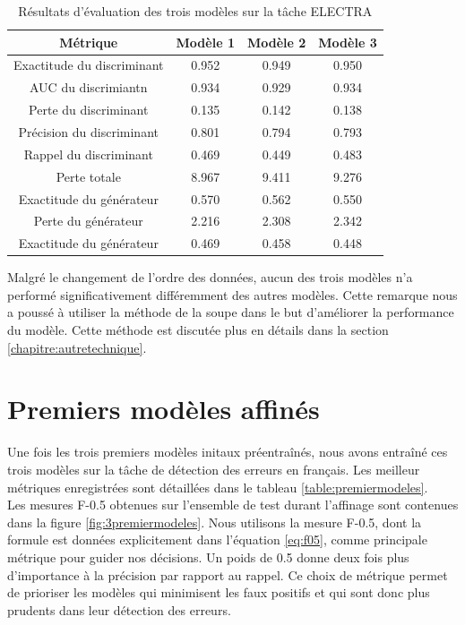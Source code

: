 \documentclass[12pt,twoside,maitrise]{dms}
\theoremstyle{definition}
\numberwithin{equation}{section}
\numberwithin{table}{chapter}
\numberwithin{figure}{chapter}
\begin{document}
\begin{table}[h!]
	\centering
	\begin{tabular}{||c | c c c||}
		\hline
		Métrique                   & Modèle 1 & Modèle 2 & Modèle 3 \\ [0.5ex]
		\hline\hline
		Exactitude du discriminant & 0.952    & 0.949    & 0.950    \\
		AUC du discrimiantn        & 0.934    & 0.929    & 0.934    \\
		Perte du discriminant      & 0.135    & 0.142    & 0.138    \\
		Précision du discriminant  & 0.801    & 0.794    & 0.793    \\
		Rappel du discriminant     & 0.469    & 0.449    & 0.483    \\
		Perte totale               & 8.967    & 9.411    & 9.276    \\
		Exactitude du générateur   & 0.570    & 0.562    & 0.550    \\
		Perte du générateur        & 2.216    & 2.308    & 2.342    \\
		Exactitude du générateur   & 0.469    & 0.458    & 0.448    \\
		\hline
	\end{tabular}
	\caption{Résultats d'évaluation des trois modèles sur la tâche ELECTRA}
	\label{table:respreentrainementsanscasse}
\end{table}
Malgré le changement de l'ordre des données, aucun des trois modèles n'a
performé significativement différemment des autres modèles. Cette remarque nous
a poussé à utiliser la méthode de la soupe \cite{soup} dans le but d'améliorer
la performance du modèle. Cette méthode est discutée plus en détails dans la
section \ref{chapitre:autretechnique}.


\section{Premiers modèles affinés}\label{section:premiersmodelesaffines}
Une fois les trois premiers modèles initaux préentraînés, nous avons entraîné
ces trois modèles sur la tâche de détection des erreurs en français. Les
meilleur métriques enregistrées sont détaillées dans le tableau
\ref{table:premiermodeles}. \\

Les mesures F-0.5 obtenues sur l'ensemble de test durant l'affinage sont
contenues dans la figure \ref{fig:3premiermodeles}. Nous utilisons la mesure
F-0.5, dont la formule est données explicitement dans l'équation \ref{eq:f05},
comme principale métrique pour guider nos décisions. Un poids de 0.5 donne deux
fois plus d'importance à la précision par rapport au rappel. Ce choix de
métrique permet de prioriser les modèles qui minimisent les faux positifs et
qui sont donc plus prudents dans leur détection des erreurs.
\end{document}
